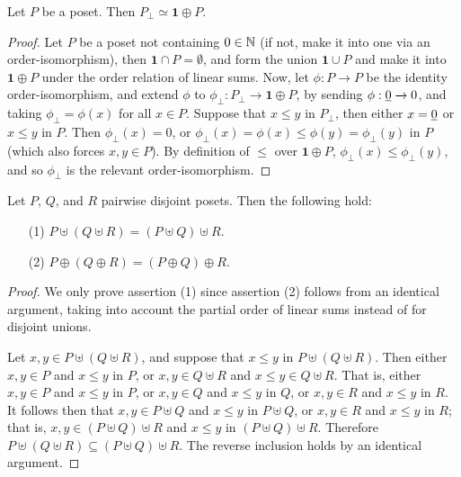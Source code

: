 \begin{proposition}\label{proposition_1.5.2}
  Let $P$ be a poset. Then $P_\bot \simeq \mathbf{1} \oplus P$.
\end{proposition}
\begin{proof}
  Let $P$ be a poset not containing $0 \in \mathbb{N}$ (if not, make it into
  one via an order-isomorphism), then $\mathbf{1} \cap P=\emptyset$,
  and form the union $\mathbf{1} \cup P$ and make it into $\mathbf{1}
  \oplus P$ under the order relation of linear sums. Now, let $\phi:P
  \xrightarrow{} P$ be the identity order-isomorphism, and extend
  $\phi$ to $\phi_\bot:P_\bot \xrightarrow{} \mathbf{1} \oplus P$, by
  sending $\phi:\underline{0} \xrightarrow{} 0$, and taking
  $\phi_\bot=\phi(x)$ for all $x \in P$. Suppose that $x \leq y$ in
  $P_\bot$, then either $x=\underline{0}$ or $x \leq y$ in $P$. Then
  $\phi_\bot(x)=0$, or $\phi_\bot(x)=\phi(x) \leq
  \phi(y)=\phi_\bot(y)$ in $P$ (which also forces $x,y \in P$). By
  definition of $\leq$ over $\mathbf{1} \oplus P$, $\phi_\bot(x) \leq
  \phi_\bot(y)$, and so $\phi_\bot$ is the relevant order-isomorphism.
\end{proof}

\begin{proposition}\label{proposition_1.5.3}
  Let $P$,  $Q$, and  $R$ pairwise disjoint posets. Then the following
  hold:
  \begin{enumerate}
    \item[(1)] $P \uplus (Q \uplus R)=(P \uplus Q) \uplus R$.
    \item[(2)] $P \oplus (Q \oplus R)=(P \oplus Q) \oplus R$.
  \end{enumerate}
\end{proposition}
\begin{proof}
  We only prove assertion (1) since assertion (2) follows from an
  identical argument, taking into account the partial order of linear
  sums instead of for disjoint unions.

  Let $x,y \in P \uplus (Q \uplus R)$, and suppose that $x \leq y$ in
  $P \uplus (Q \uplus R)$. Then either $x,y \in P$ and $x \leq y$ in
  $P$, or  $x,y \in Q \uplus R$ and $x \leq y \in Q \uplus R$. That
  is, either $x,y \in P$ and $x \leq y$ in $P$, or $x,y \in Q$ and $x
  \leq y$ in $Q$, or  $x,y \in R$ and $x \leq y$ in $R$. It follows
  then that $x,y \in P \uplus Q$ and $x \leq y$ in $P \uplus Q$, or
  $x,y \in R$ and $x \leq y$ in $R$; that is, $x,y \in (P \uplus Q)
  \uplus R$  and $x \leq y$ in $(P \uplus Q) \uplus R$. Therefore $P
  \uplus (Q \uplus R) \subseteq (P \uplus Q) \uplus R$. The reverse
  inclusion holds by an identical argument.
\end{proof}

